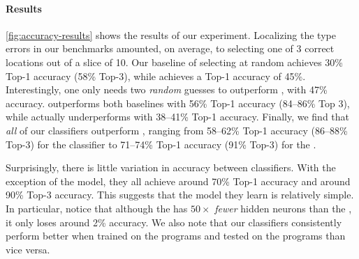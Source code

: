 \paragraph{Results}
\autoref{fig:accuracy-results} shows the results of our experiment.
%
Localizing the type errors in our benchmarks amounted, on average, to
selecting one of 3 correct locations out of a slice of 10.
%
Our baseline of selecting at random achieves 30\% Top-1
accuracy (58\% Top-3), while \ocaml achieves a Top-1 accuracy of 45\%.
%
Interestingly, one only needs two \emph{random} guesses to outperform
\ocaml, with 47\% accuracy.
%
\sherrloc outperforms both baselines with 56\% Top-1 accuracy (84--86\% Top
3), while \mycroft actually underperforms \ocaml with 38--41\% Top-1
accuracy.
%
Finally, we find that \emph{all} of our classifiers outperform \sherrloc,
ranging from 58--62\% Top-1 accuracy (86--88\% Top-3) for the \linear
classifier to 71--74\% Top-1 accuracy (91\% Top-3) for the \hiddenFH.

Surprisingly, there is little variation in accuracy between classifiers.
With the exception of the \linear model, they all achieve around 70\%
Top-1 accuracy and around 90\% Top-3 accuracy.
%
This suggests that the model they learn is relatively simple.
%
In particular, notice that although the \hiddenT has $50\times$ \emph{fewer}
hidden neurons than the \hiddenFH, it only loses around 2\% accuracy.
%
We also note that our classifiers consistently perform better when
trained on the \FALL programs and tested on the \SPRING programs than
vice versa.
